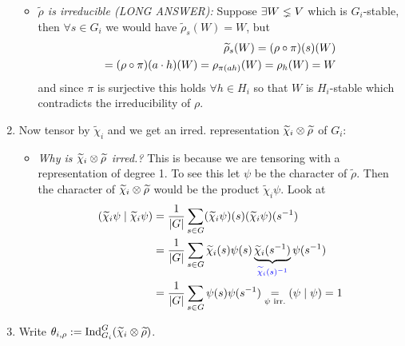 \documentclass[a4paper]{article}
\begin{document}
\begin{enumerate}
        \begin{itemize}
          \item \color{gray}\emph{$\tilde \rho$ is irreducible (LONG ANSWER):} Suppose $\exists W \lneq V$ which is $G_{i}$-stable, then $\forall s \in G_{i}$ we would have $\tilde \rho_{s}(W) = W$, but
                \begin{align*}
                  \widetilde \rho_{s}(W) = (\rho \circ \pi)(s)(W) \\
                  = (\rho \circ \pi)(a \cdot h)(W) = \rho_{\pi(ah)}(W) = \rho_{h}(W) = W
                \end{align*}
                and since $\pi$ is surjective this holds $\forall h \in H_{i}$ so that $W$ is $H_{i}$-stable which contradicts the irreducibility of $\rho$.
        \end{itemize}
  \item Now tensor by $\tilde \chi_{i}$ and we get an irred. representation $\widetilde \chi_{i} \otimes \widetilde \rho$ of $G_{i}$:
        \begin{itemize}
          \item \emph{Why is $\widetilde \chi_{i} \otimes \widetilde \rho$ irred.?} This is because we are tensoring with a representation of degree 1. To see this let $\psi$ be the character of $\tilde \rho$. Then the character of $\widetilde \chi_{i} \otimes \widetilde\rho$ would be the product $\tilde \chi_{i} \psi$. Look at
                \begin{align*}
                  (\widetilde \chi_{i} \psi \mid \widetilde \chi_{i} \psi) &= \frac 1{|G|}\sum_{s \in G}(\widetilde \chi_{i} \psi)(s) (\widetilde \chi_{i}\psi)(s^{-1}) \\
                  &= \frac 1{|G|}\sum_{s \in G}\widetilde \chi_{i}(s)\psi(s) \underbrace{\widetilde \chi_{i}(s^{-1})}_{\color{blue}\widetilde \chi_{i}(s)^{-1}}\psi(s^{-1})\\
                                                                           &= \frac 1{|G|} \sum_{s \in G}\psi(s)\psi(s^{-1}) \underset{\psi \text{ irr.}}= (\psi \mid \psi) = 1
                \end{align*}
        \end{itemize}
        \item Write $\theta_{i,\rho} := \operatorname{Ind}_{G_{i}}^{G}(\widetilde \chi_{i} \otimes \widetilde \rho)$.
\end{enumerate}
\end{document}
